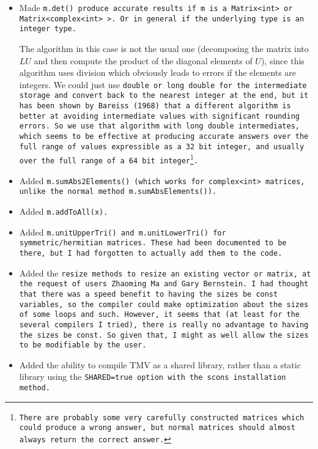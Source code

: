 \begin{itemize}

\item Made \tt{m.det()} produce accurate results if \tt{m} is a \tt{Matrix<int>} or 
\tt{Matrix<complex<int> >}.  Or in general if the underlying type is an integer type.

The algorithm in this case is not the usual one (decomposing the matrix into $LU$ and
then compute the product of the diagonal elements of $U$), since this algorithm uses division which obviously leads to errors if the elements are integers.  
We could just use \tt{double} or \tt{long double} for
the intermediate storage and convert back to the nearest integer at the end, but it has
been shown by Bareiss (1968) that a different algorithm is better at avoiding intermediate
values with significant rounding errors.  So we use that algorithm with \tt{long double} 
intermediates, which seems to be effective at producing accurate answers over the 
full range of values expressible as a 32 bit integer, and usually over the full range of a 64 bit 
integer\footnote{There are probably some very carefully constructed matrices which could produce 
a wrong answer, but normal matrices should almost always return the correct answer.}.

\item Added \tt{m.sumAbs2Elements()} (which works for \tt{complex<int>} matrices, unlike the normal method \tt{m.sumAbsElements()}).

\item Added \tt{m.addToAll(x)}.

\item Added \tt{m.unitUpperTri()} and \tt{m.unitLowerTri()} for symmetric/hermitian matrices.
These had been documented to be there, but I had forgotten to actually add them to the code.

\item Added the \tt{resize} methods to resize an existing vector or matrix, at the request of users Zhaoming Ma and Gary Bernstein.  
I had thought that there was a speed benefit to having the sizes be \tt{const} variables, so the compiler could make optimization about the sizes of some loops and such.  However, it seems that (at least for the several compilers I tried), there is really no advantage to having the sizes be \tt{const}.  So given that, I might as well allow the sizes to be modifiable by the user.

\item Added the ability to compile TMV as a shared library, rather than a static library 
using the \tt{SHARED=true} option with the scons installation method.


\end{itemize}
